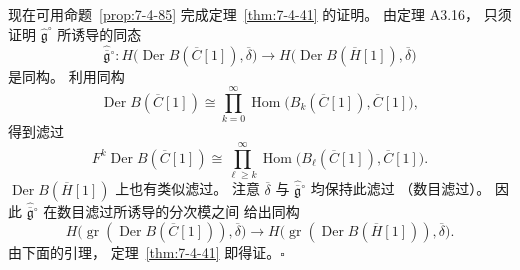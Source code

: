 
现在可用命题~\ref{prop:7-4-85}
完成定理~\ref{thm:7-4-41}
的证明。
由定理 A3.16，
只须证明
$\widehat{\mathfrak g}^{\circ}$
所诱导的同态
\[
\widehat{\overline{\mathfrak g}}{}^{\circ}:
H\bigl(
\operatorname{Der}B(\overline C[1]),
\overline\delta
\bigr)
\longrightarrow
H\bigl(
\operatorname{Der}B(\overline H[1]),
\overline\delta
\bigr)
\]
是同构。
利用同构
\[
\operatorname{Der}B(\overline C[1])
\cong
\prod_{k=0}^{\infty}
\operatorname{Hom}\bigl(
B_k(\overline C[1]),
\overline C[1]
\bigr),
\]
得到滤过
\[
F^k\operatorname{Der}B(\overline C[1])
\cong
\prod_{\ell\ge k}^{\infty}
\operatorname{Hom}\bigl(
B_\ell(\overline C[1]),
\overline C[1]
\bigr).
\]
$\operatorname{Der}B(\overline H[1])$
上也有类似滤过。
注意
$\overline\delta$
与
$\widehat{\overline{\mathfrak g}}{}^{\circ}$
均保持此滤过
（数目滤过）。
因此
$\widehat{\overline{\mathfrak g}}{}^{\circ}$
在数目滤过所诱导的分次模之间
给出同构
\[
H\bigl(
\operatorname{gr}(
\operatorname{Der}B(\overline C[1])
),\overline\delta
\bigr)
\longrightarrow
H\bigl(
\operatorname{gr}(
\operatorname{Der}B(\overline H[1])
),\overline\delta
\bigr).
\]
由下面的引理，
定理~\ref{thm:7-4-41}
即得证。\hfill$\square$
